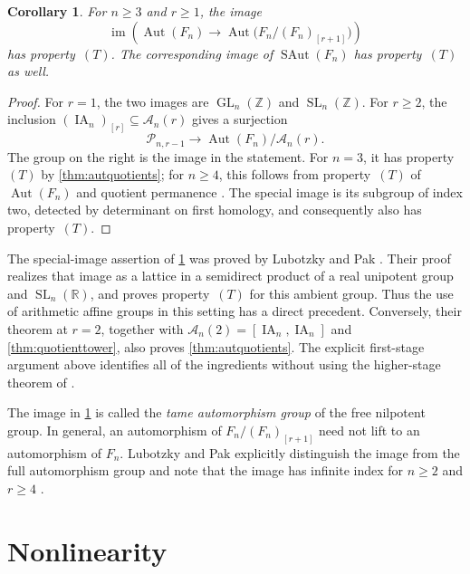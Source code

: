 \documentclass[11pt,a4paper]{article}
\newtheorem{corollary}[theorem]{Corollary}
\theoremstyle{definition}
\newcommand{\R}{\mathbb R}
\newcommand{\Z}{\mathbb Z}
\newcommand{\SL}{\operatorname{SL}}
\newcommand{\GL}{\operatorname{GL}}
\newcommand{\Aut}{\operatorname{Aut}}
\newcommand{\im}{\operatorname{im}}
\newcommand{\rt}{(T)}
\begin{document}
\begin{corollary}\label{cor:tamefreequotients}
For \(n\ge3\) and \(r\ge1\), the image
\[
 \im\!\left(\Aut(F_n)\longrightarrow
        \Aut\bigl(F_n/(F_n)_{[r+1]}\bigr)\right)
\]
has property~\(\rt\). The corresponding image of
\(\operatorname{SAut}(F_n)\) has property~\(\rt\) as well.
\end{corollary}
\begin{proof}
For \(r=1\), the two images are \(\GL_n(\Z)\) and
\(\SL_n(\Z)\). For \(r\ge2\), the inclusion
\((\operatorname{IA}_n)_{[r]}\subseteq\mathcal A_n(r)\)
gives a surjection
\[
 \mathcal{P}_{n,r-1}\longrightarrow
        \Aut(F_n)/\mathcal A_n(r).
\]
The group on the right is the image in the statement. For \(n=3\),
it has property~\(\rt\) by \cref{thm:autquotients}; for \(n\ge4\),
this follows from property~\(\rt\) of \(\Aut(F_n)\) and quotient
permanence \cite{KalubaNowakOzawa,KalubaKielakNowak,NitscheAutFour}.
The special image is its subgroup of index two, detected by determinant
on first homology, and consequently also has property~\(\rt\).
\end{proof}

The special-image assertion of \cref{cor:tamefreequotients}
was proved by Lubotzky and Pak
\cite[Theorem~3.8 and Section~4]{LubotzkyPak}. Their proof
realizes that image as a lattice in a semidirect product of
a real unipotent group and \(\SL_n(\R)\), and proves
property~\(\rt\) for this ambient group. Thus the use of
arithmetic affine groups in this setting has a direct
precedent. Conversely, their theorem at \(r=2\), together
with \(\mathcal A_n(2)=[\operatorname{IA}_n,
\operatorname{IA}_n]\) and \cref{thm:quotienttower}, also
proves \cref{thm:autquotients}. The explicit first-stage
argument above identifies all of the ingredients without
using the higher-stage theorem of \cite{LubotzkyPak}.

The image in \cref{cor:tamefreequotients} is called the
\emph{tame automorphism group} of the free nilpotent group.
 In general, an automorphism of
\(F_n/(F_n)_{[r+1]}\) need not lift to an automorphism of
\(F_n\). Lubotzky and Pak explicitly distinguish the image from
the full automorphism group and note that the image has
infinite index for \(n\ge2\) and \(r\ge4\)
\cite[Example~1.14]{LubotzkyPak}.


\section{Nonlinearity}
\label{sec:nonlinearity}
\end{document}
